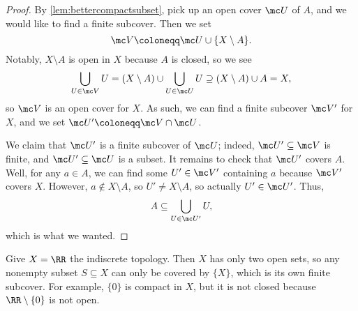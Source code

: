 \documentclass[../notes.tex]{subfiles}
\begin{document}
\begin{proof}
	By \autoref{lem:bettercompactsubset}, pick up an open cover $\mc U$ of $A$, and we would like to find a finite subcover. Then we set
	\[\mc V\coloneqq\mc U\cup\{X\setminus A\}.\]
	Notably, $X\setminus A$ is open in $X$ because $A$ is closed, so we see
	\[\bigcup_{U\in\mc V}U=(X\setminus A)\cup\bigcup_{U\in\mc U}U\supseteq(X\setminus A)\cup A=X,\]
	so $\mc V$ is an open cover for $X$. As such, we can find a finite subcover $\mc V'$ for $X$, and we set $\mc U'\coloneqq\mc V\cap\mc U$.
	
	We claim that $\mc U'$ is a finite subcover of $\mc U$; indeed, $\mc U'\subseteq\mc V$ is finite, and $\mc U'\subseteq\mc U$ is a subset. It remains to check that $\mc U'$ covers $A$. Well, for any $a\in A$, we can find some $U'\in\mc V'$ containing $a$ because $\mc V'$ covers $X$. However, $a\notin X\setminus A$, so $U'\ne X\setminus A$, so actually $U'\in\mc U'$. Thus,
	\[A\subseteq\bigcup_{U\in\mc U'}U,\]
	which is what we wanted.
\end{proof}
\begin{example} \label{ex:compactnotclosed}
	Give $X=\RR$ the indiscrete topology. Then $X$ has only two open sets, so any nonempty subset $S\subseteq X$ can only be covered by $\{X\}$, which is its own finite subcover. For example, $\{0\}$ is compact in $X$, but it is not closed because $\RR\setminus\{0\}$ is not open.
\end{example}
\end{document}
